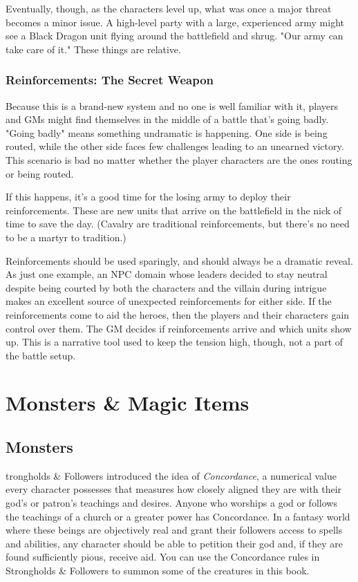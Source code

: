 \documentclass[10pt,a4paper,twoside,bg=print,twocolumn,openany,nodeprecatedcode]{dndbook}
\begin{document}
Eventually, though, as the characters level up, what was once a major threat becomes a minor issue. A high-level party with a large, experienced army might see a Black Dragon unit flying around the battlefield and shrug. "Our army can take care of it." These things are relative.

\subsection{Reinforcements: The Secret Weapon}
Because this is a brand-new system and no one is well familiar with it, players and GMs might find themselves in the middle of a battle that's going badly. "Going badly" means something undramatic is happening. One side is being routed, while the other side faces few challenges leading to an unearned victory. This scenario is bad no matter whether the player characters are the ones routing or being routed.

If this happens, it's a good time for the losing army to deploy their reinforcements. These are new units that arrive on the battlefield in the nick of time to save the day. (Cavalry are traditional reinforcements, but there's no need to be a martyr to tradition.)

Reinforcements should be used sparingly, and should always be a dramatic reveal. As just one example, an NPC domain whose leaders decided to stay neutral despite being courted by both the characters and the villain during intrigue makes an excellent source of unexpected reinforcements for either side. If the reinforcements come to aid the heroes, then the players and their characters gain control over them. The GM decides if reinforcements arrive and which units show up. This is a narrative tool used to keep the tension high, though, not a part of the battle setup.

\chapter{Monsters \& Magic Items}
\section{Monsters}
trongholds \& Followers introduced the idea of \textit{Concordance}, a numerical value every character possesses that measures how closely aligned they are with their god's or patron's teachings and desires. Anyone who worships a god or follows the teachings of a church or a greater power has Concordance. In a fantasy world where these beings are objectively real and grant their followers access to spells and abilities, any character should be able to petition their god and, if they are found sufficiently pious, receive aid. You can use the Concordance rules in Strongholds \& Followers to summon some of the creatures in this book.
\end{document}
